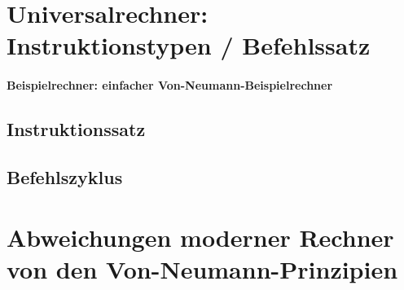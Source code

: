 \section{Universalrechner: Instruktionstypen / Befehlssatz}

\paragraph{Beispielrechner: einfacher Von-Neumann-Beispielrechner}

\subsection{Instruktionssatz}

\subsection{Befehlszyklus}


\section{Abweichungen moderner Rechner von den Von-Neumann-Prinzipien}
